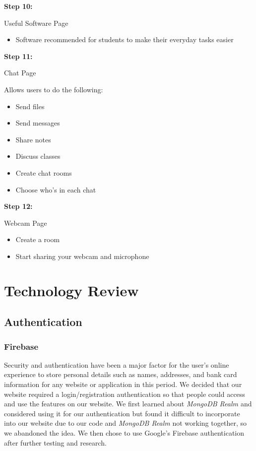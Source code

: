 \textbf{Step 10:} \hfill \break

Useful Software Page

\begin{itemize}
  \item  Software recommended for students to make their everyday tasks easier
\end{itemize}



\textbf{Step 11:} \hfill \break

Chat Page

Allows users to do the following:

\begin{itemize}
  \item Send files
  \item Send messages
  \item Share notes
  \item Discuss classes
  \item Create chat rooms
  \item Choose who’s in each chat
\end{itemize}



\textbf{Step 12:} \hfill \break

Webcam Page

\begin{itemize}
  \item Create a room 
  \item Start sharing your webcam and microphone
\end{itemize}


\chapter{Technology Review}

\section{Authentication}
\subsection{Firebase}


Security and authentication have been a major factor for the user's online experience to store personal details such as names, addresses, and bank card information for any website or application in this period. We decided that our website required a login/registration authentication so that people could access and use the features on our website. We first learned about \textit{MongoDB Realm \cite{ref28}} and considered using it for our authentication but found it difficult to incorporate into our website due to our code and \textit{MongoDB Realm} not working together, so we abandoned the idea. We then chose to use Google's Firebase\cite{ref27} authentication after further testing and research.\hfill \break

